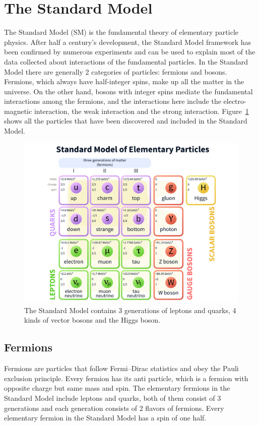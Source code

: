 
\section{The Standard Model}
The Standard Model (SM)\cite{SMref1,SMref2,SMref3} is the fundamental theory of elementary particle physics. After half a century's development, the Standard Model framework has been confirmed by numerous experiments and can be used to explain most of the data collected about interactions of the fundamental particles. In the Standard Model there are generally 2 categories of particles: fermions and bosons. Fermions, which always have half-integer spins, make up all the matter in the universe. On the other hand, bosons with integer spins mediate the fundamental interactions among the fermions, and the interactions here include the electro-magnetic interaction, the weak interaction and the strong interaction. Figure~\ref{fig:smpfamily} shows all the particles that have been discovered and included in the Standard Model.
\begin{figure}[htbp]
\begin{center}
\includegraphics[width=0.72\linewidth]{figures/smpfamily.pdf}
\caption{The Standard Model contains 3 generations of leptons and quarks, 4 kinds of vector bosons and the Higgs boson.}
\label{fig:smpfamily}
\end{center}
\end{figure}

\subsection{Fermions}
Fermions are particles that follow Fermi–Dirac statistics and obey the Pauli exclusion principle. Every fermion has its anti particle, which is a fermion with opposite charge but same mass and spin. The elementary fermions in the Standard Model include leptons and quarks, both of them consist of 3 generations and each generation consists of 2 flavors of fermions. Every elementary fermion in the Standard Model has a spin of one half.
